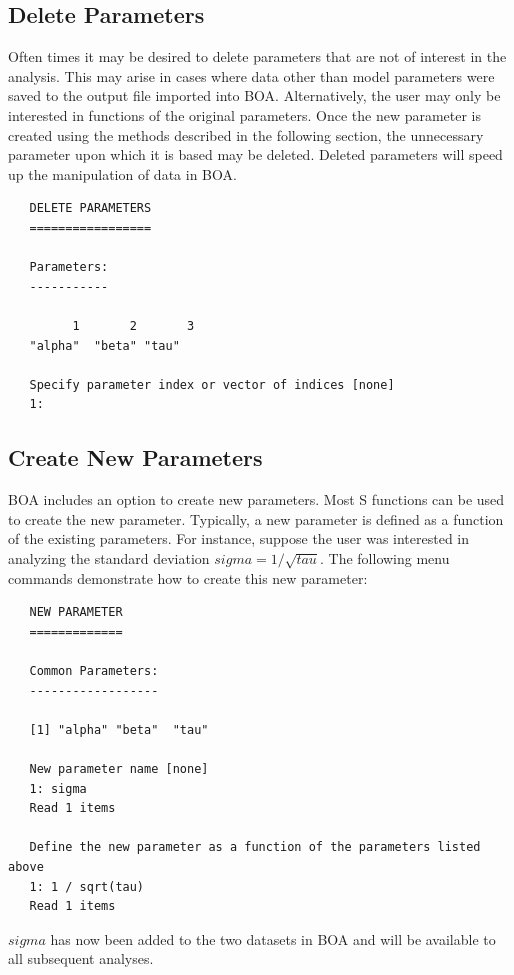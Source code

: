 \documentclass[12pt,letterpaper]{report}
\begin{document}
\subsection{Delete Parameters}
\noindent
Often times it may be desired to delete parameters that are not of interest in
the analysis.  This may arise in cases where data other than model parameters
were saved to the output file imported into BOA. Alternatively, the user may
only be interested in functions of the original parameters.  Once the new
parameter is created using the methods described in the following section, the
unnecessary parameter upon which it is based may be deleted.  Deleted parameters
will speed up the manipulation of data in BOA.
\vskip 9pt
\begin{tiny}
\begin{verbatim}
   DELETE PARAMETERS
   =================

   Parameters:
   -----------

         1       2       3
   "alpha"  "beta" "tau"

   Specify parameter index or vector of indices [none]
   1:
\end{verbatim}
\end{tiny}

\subsection{Create New Parameters}
\noindent
BOA includes an option to create new parameters.  Most S functions can be used
to create the new parameter.  Typically, a new parameter is defined as a
function of the existing parameters.  For instance, suppose the user was
interested in analyzing the standard deviation $sigma = 1 / \sqrt{tau}$.  The
following menu commands demonstrate how to create this new parameter:
\vskip 9pt
\begin{tiny}
\begin{verbatim}
   NEW PARAMETER
   =============

   Common Parameters:
   ------------------

   [1] "alpha" "beta"  "tau"

   New parameter name [none]
   1: sigma
   Read 1 items

   Define the new parameter as a function of the parameters listed above
   1: 1 / sqrt(tau)
   Read 1 items
\end{verbatim}
\end{tiny}
$sigma$ has now been added to the two datasets in BOA and will be available to all
subsequent analyses.
\end{document}
